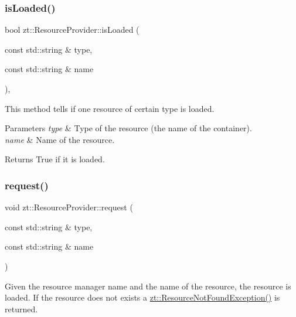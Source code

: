 \subsubsection{\texorpdfstring{is\+Loaded()}{isLoaded()}}
{\footnotesize\ttfamily bool zt\+::\+Resource\+Provider\+::is\+Loaded (\begin{DoxyParamCaption}\item[{const std\+::string \&}]{type,  }\item[{const std\+::string \&}]{name }\end{DoxyParamCaption})\hspace{0.3cm}{\ttfamily [inline]}, {\ttfamily [protected]}}



This method tells if one resource of certain type is loaded. 


\begin{DoxyParams}{Parameters}
{\em type} & Type of the resource (the name of the container). \\
\hline
{\em name} & Name of the resource. \\
\hline
\end{DoxyParams}
\begin{DoxyReturn}{Returns}
True if it is loaded. 
\end{DoxyReturn}
\mbox{\label{classzt_1_1_resource_provider_aa52dfc3f3022366aa279b78ca36b673e}} 
\subsubsection{\texorpdfstring{request()}{request()}}
{\footnotesize\ttfamily void zt\+::\+Resource\+Provider\+::request (\begin{DoxyParamCaption}\item[{const std\+::string \&}]{type,  }\item[{const std\+::string \&}]{name }\end{DoxyParamCaption})\hspace{0.3cm}{\ttfamily [inline]}}



Given the resource manager name and the name of the resource, the resource is loaded. If the resource does not exists a \hyperlink{classzt_1_1_resource_not_found_exception}{zt\+::\+Resource\+Not\+Found\+Exception()} is returned. 


